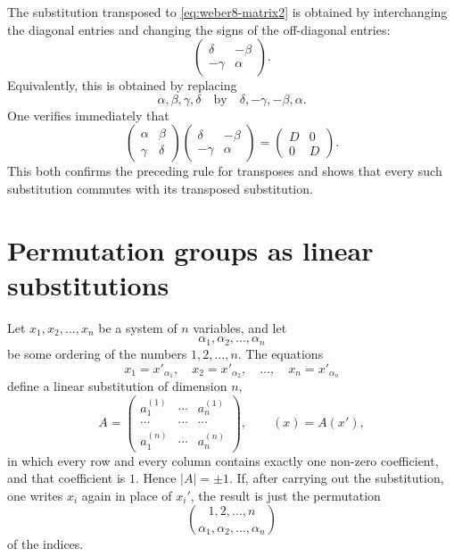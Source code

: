 \documentclass[11pt,a4paper]{book}
\begin{document}
The substitution transposed to \eqref{eq:weber8-matrix2} is obtained by interchanging the diagonal entries and changing the signs of the off-diagonal entries:
\begin{equation}\label{eq:weber8-mobius-adjoint}
\begin{pmatrix}\delta&-\beta\\ -\gamma&\alpha\end{pmatrix}.
\end{equation}
Equivalently, this is obtained by replacing
\[
\alpha,\beta,\gamma,\delta
\quad\text{by}\quad
\delta,-\gamma,-\beta,\alpha.
\]
One verifies immediately that
\begin{equation}\label{eq:weber8-mobius-adjoint-product}
\begin{pmatrix}\alpha&\beta\\ \gamma&\delta\end{pmatrix}
\begin{pmatrix}\delta&-\beta\\ -\gamma&\alpha\end{pmatrix}
=
\begin{pmatrix}D&0\\0&D\end{pmatrix}.
\end{equation}
This both confirms the preceding rule for transposes and shows that every such substitution commutes with its transposed substitution.

\section*{Permutation groups as linear substitutions}
Let $x_1,x_2,\ldots,x_n$ be a system of $n$ variables, and let
\[
\alpha_1,\alpha_2,\ldots,\alpha_n
\]
be some ordering of the numbers $1,2,\ldots,n$.  The equations
\begin{equation}\label{eq:weber8-perm-action}
x_1=x'_{\alpha_1},\quad x_2=x'_{\alpha_2},\quad\ldots,\quad x_n=x'_{\alpha_n}
\end{equation}
define a linear substitution of dimension $n$,
\begin{equation}\label{eq:weber8-perm-matrix}
A=\begin{pmatrix}
a_1^{(1)}&\cdots&a_n^{(1)}\\
\cdots&\cdots&\cdots\\
a_1^{(n)}&\cdots&a_n^{(n)}
\end{pmatrix},
\qquad (x)=A(x'),
\end{equation}
in which every row and every column contains exactly one non-zero coefficient, and that coefficient is $1$.  Hence $|A|=\pm1$.  If, after carrying out the substitution, one writes $x_i$ again in place of $x_i'$, the result is just the permutation
\[
\binom{1,2,\ldots,n}{\alpha_1,\alpha_2,\ldots,\alpha_n}
\]
of the indices.
\end{document}
